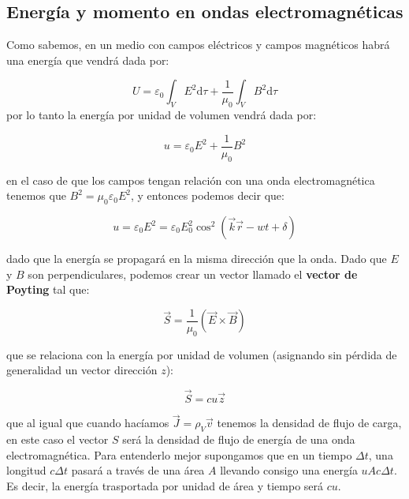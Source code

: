 \documentclass[12pt,a4paper]{article}
\newcommand{\D}{\mathrm{d}}
\begin{document}
\subsection{Energía y momento en ondas electromagnéticas}

Como sabemos, en un medio con campos eléctricos y campos magnéticos habrá una energía que vendrá dada por:

$$
U = \varepsilon_0 \int_V E^2 \D \tau +   \dfrac{1}{\mu_0} \int_V B^2 \D \tau
$$
por lo tanto la energía por unidad de volumen vendrá dada por: 

\begin{equation}
u = \varepsilon_0 E^2 + \dfrac{1}{\mu_0} B^2
\end{equation}

en el caso de que los campos tengan relación con una onda electromagnética tenemos que $B^2 = \mu_0 \varepsilon_0 E^2$, y entonces podemos decir que:

\begin{equation}
u = \varepsilon_0 E^2 = \varepsilon_0 E_0^2 \cos^2 (\vec{k} \vec{r} - wt + \delta)
\end{equation}

dado que la energía se propagará en la misma dirección que la onda. Dado que $E$ y $B$ son perpendiculares, podemos crear un vector llamado el \textbf{vector de Poyting} tal que:

\begin{equation}
\vec{S} = \dfrac{1}{\mu_0} (\vec{E} \times \vec{B})
\end{equation}

que se relaciona con la energía por unidad de volumen (asignando sin pérdida de generalidad un vector dirección $z$):

\begin{equation}
\vec{S} = c u \vec{z}
\end{equation}

que al igual que cuando hacíamos $\vec{J}=\rho_V \vec{v}$ tenemos la densidad de flujo de carga, en este caso el vector $S$ será la densidad de flujo de energía de una onda electromagnética. Para entenderlo mejor supongamos que en un tiempo $\Delta t$, una longitud $c \Delta t$ pasará a través de una área $A$ llevando consigo una energía $u A c \Delta t$. Es decir, la energía trasportada por unidad de área y tiempo será $c u$.\\
\end{document}
